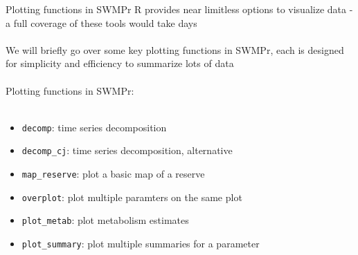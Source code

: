 \documentclass[xcolor=dvipsnames]{beamer}\usepackage[]{graphicx}\usepackage[]{color}
\begin{document}
\begin{frame}[fragile]{Plotting functions in SWMPr}
R provides near limitless options to visualize data - a full coverage of these tools would take days \\~\\
We will briefly go over some key plotting functions in SWMPr, each is designed for simplicity and efficiency to summarize lots of data \\~\\
Plotting functions in SWMPr: \\~\\
\begin{itemize}
\item \texttt{decomp}: time series decomposition
\item \texttt{decomp\_cj}: time series decomposition, alternative
\item \texttt{map\_reserve}: plot a basic map of a reserve
\item \texttt{overplot}: plot multiple paramters on the same plot
\item \texttt{plot\_metab}: plot metabolism estimates
\item \texttt{plot\_summary}: plot multiple summaries for a parameter
\end{itemize}
\end{frame}
\end{document}
